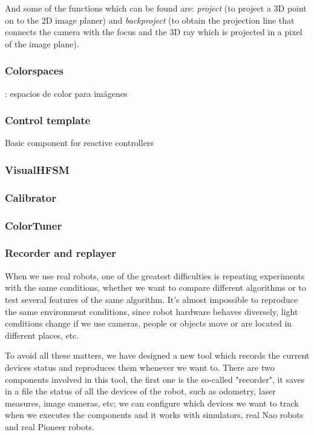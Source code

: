 \documentclass[twocolumn]{svjour3}          %
\begin{document}
And some of the functions which can be found are: \textit{project} (to project a 3D point on to the 2D image planer) and \textit{backproject} (to obtain the projection line that connects the camera with the focus and the 3D ray which is projected in a pixel of the image plane).

\subsubsection{Colorspaces}: espacios de color para imágenes

\subsubsection{Control template}
Basic component for reactive controllers



\subsubsection{VisualHFSM}
\subsubsection{Calibrator}
\subsubsection{ColorTuner}
\subsubsection{Recorder and replayer}

When we use real robots, one of the greatest difficulties is repeating experiments with the same conditions, whether we want to compare different algorithms or to test several features of the same algorithm. It's almost impossible to reproduce the same environment conditions, since robot hardware behaves diversely, light conditions change if we use cameras, people or objects move or are located in different places, etc.

To avoid all these matters, we have designed a new tool which records the current devices status and reproduces them whenever we want to. There are two components involved in this tool, the first one is the so-called "recorder", it saves in a file the status of all the devices of the robot, such as odometry, laser measures, image cameras, etc; we can configure which devices we want to track when we executes the components and it works with simulators, real Nao robots and real Pioneer robots.
\end{document}
